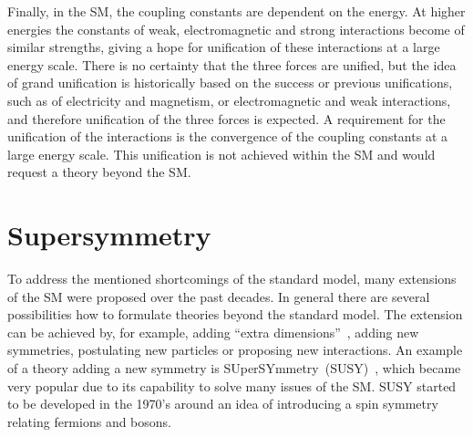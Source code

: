 Finally, in the SM, the coupling constants are dependent on the energy. At higher energies the constants of weak, electromagnetic and strong interactions become of similar strengths, giving a hope for unification of these interactions at a large energy scale. There is no certainty that the three forces are unified, but the idea of grand unification is historically based on the success or previous unifications,  such as of electricity and magnetism, or electromagnetic and weak interactions, and  therefore unification of the three forces is expected. A requirement for the unification of the interactions is the convergence of the coupling constants at a large energy scale. This unification is not achieved within the SM and would request a theory beyond the SM.
 





\section{Supersymmetry~\label{sec:SUSY}}

To address the mentioned shortcomings of the standard model, many extensions of the SM were proposed over the past decades. In general there are several possibilities how to formulate theories beyond the standard model. The extension can be achieved by, for example, adding ``extra dimensions''~\cite{Patrignani:2016xqp}, adding new symmetries, postulating new particles or proposing new interactions. An example of a theory adding a new symmetry is SUperSYmmetry~(SUSY)~\cite{Martin:1997ns}, which became very popular due to its capability to solve many issues of the SM. SUSY started to be developed in the 1970's around an idea of introducing a spin symmetry relating fermions and bosons.
  
